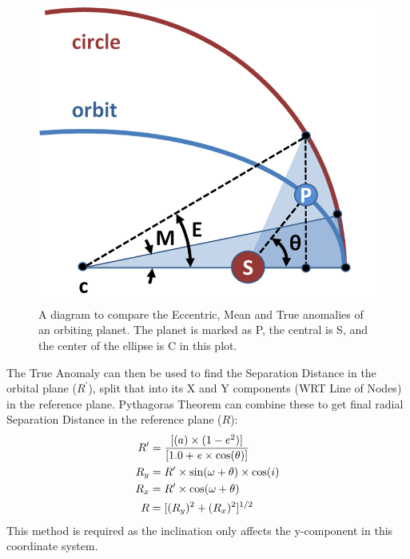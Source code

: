\documentclass[12pt,preprint]{aastex}
\begin{document}
\begin{figure}[ht]
\begin{center}
\includegraphics[scale=0.4]{Anomalies-MOD.png}
\caption[Diagram of Anomalies]{A diagram to compare the Eccentric, Mean and True anomalies of an orbiting planet.  The planet is marked as P, the central is S, and the center of the ellipse is C in this plot. }
\label{fig:Anomalies}
\end{center}
\end{figure}

The True Anomaly can then be used to find the Separation Distance in the orbital plane ($R^{\prime}$), split that into its X and Y components (WRT Line of Nodes) in the reference plane.  Pythagoras Theorem can combine these to get final radial Separation Distance in the reference plane ($R$):
\begin{subequations}
\begin{align}
\label{eq:4.1.6a}
R^{\prime}& = \frac{[(a)\times(1-e^{2})]}{[1.0 +{\it e}\times \cos(\theta)]}\\
\label{eq:4.1.6b}
R_y& = R^{\prime} \times \sin(\omega + \theta) \times \cos(i)\\
\label{eq:4.1.6c}
R_x& = R^{\prime} \times \cos(\omega + \theta)\\
\label{eq:4.1.6d}
R& = [(R_y)^{2} + (R_x)^{2}]^{1/2}
\end{align}
\end{subequations}
This method is required as the inclination only affects the y-component in this coordinate system.
\end{document}
